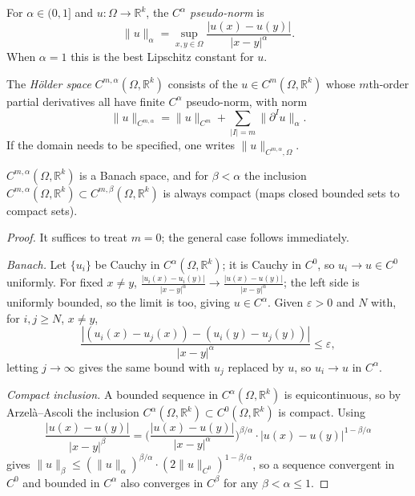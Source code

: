 \begin{definition}
  \label{def:pet-ch11-holder-pseudonorm}
  For $\alpha\in(0,1]$ and $u:\Omega\to\mathbb{R}^k$, the \emph{$C^\alpha$
  pseudo-norm} is
  \[
    \|u\|_\alpha=\sup_{x,y\in\Omega}\frac{|u(x)-u(y)|}{|x-y|^\alpha}.
  \]
  When $\alpha=1$ this is the best Lipschitz constant for $u$.
\end{definition}

\begin{definition}
  \label{def:pet-ch11-holder-space}
  The \emph{Hölder space} $C^{m,\alpha}(\Omega,\mathbb{R}^k)$ consists of the
  $u\in C^m(\Omega,\mathbb{R}^k)$ whose $m$th-order partial derivatives all have
  finite $C^\alpha$ pseudo-norm, with norm
  \[
    \|u\|_{C^{m,\alpha}}=\|u\|_{C^m}+\sum_{|I|=m}\|\partial^Iu\|_\alpha.
  \]
  If the domain needs to be specified, one writes $\|u\|_{C^{m,\alpha},\Omega}$.
\end{definition}

\begin{lemma}
  \label{lem:pet-ch11-holder-space-banach-compact-inclusion}
  $C^{m,\alpha}(\Omega,\mathbb{R}^k)$ is a Banach space, and for $\beta<\alpha$ the
  inclusion $C^{m,\alpha}(\Omega,\mathbb{R}^k)\subset C^{m,\beta}(\Omega,\mathbb{R}^k)$ is
  always compact (maps closed bounded sets to compact sets).
\end{lemma}
\begin{proof}
  It suffices to treat $m=0$; the general case follows immediately.

  \emph{Banach.} Let $\{u_i\}$ be Cauchy in $C^\alpha(\Omega,\mathbb{R}^k)$; it is
  Cauchy in $C^0$, so $u_i\to u\in C^0$ uniformly. For fixed $x\ne y$,
  $\frac{|u_i(x)-u_i(y)|}{|x-y|^\alpha}\to\frac{|u(x)-u(y)|}{|x-y|^\alpha}$;
  the left side is uniformly bounded, so the limit is too, giving
  $u\in C^\alpha$. Given $\varepsilon>0$ and $N$ with, for $i,j\ge N$,
  $x\ne y$,
  \[
    \frac{|(u_i(x)-u_j(x))-(u_i(y)-u_j(y))|}{|x-y|^\alpha}\le\varepsilon,
  \]
  letting $j\to\infty$ gives the same bound with $u_j$ replaced by $u$, so
  $u_i\to u$ in $C^\alpha$.

  \emph{Compact inclusion.} A bounded sequence in $C^\alpha(\Omega,\mathbb{R}^k)$
  is equicontinuous, so by Arzelà--Ascoli the inclusion
  $C^\alpha(\Omega,\mathbb{R}^k)\subset C^0(\Omega,\mathbb{R}^k)$ is compact. Using
  \[
    \frac{|u(x)-u(y)|}{|x-y|^\beta}
    =\Big(\frac{|u(x)-u(y)|}{|x-y|^\alpha}\Big)^{\beta/\alpha}\cdot|u(x)-u(y)|^{1-\beta/\alpha}
  \]
  gives $\|u\|_\beta\le(\|u\|_\alpha)^{\beta/\alpha}\cdot(2\|u\|_{C^0})^{1-\beta/\alpha}$,
  so a sequence convergent in $C^0$ and bounded in $C^\alpha$ also converges
  in $C^\beta$ for any $\beta<\alpha\le1$.
\end{proof}

